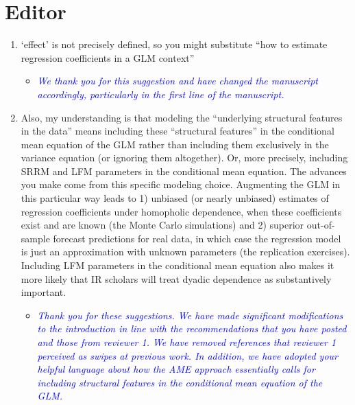 \section*{Editor}

\begin{enumerate}
	\item `effect' is not precisely defined, so you might substitute ``how to estimate regression coefficients in a GLM context''
	\begin{itemize}
		\item \textcolor{blue}{ \emph{
		We thank you for this suggestion and have changed the manuscript accordingly, particularly in the first line of the manuscript.}}
	\end{itemize}
	\item Also, my understanding is that modeling the ``underlying structural features in the data'' means including these ``structural features'' in the conditional mean equation of the GLM rather than including them exclusively in the variance equation (or ignoring them altogether). Or, more precisely, including SRRM and LFM parameters in the conditional mean equation. The advances you make come from this specific modeling choice. Augmenting the GLM in this particular way leads to 1) unbiased (or nearly unbiased) estimates of regression coefficients under homopholic dependence, when these coefficients exist and are known (the Monte Carlo simulations) and 2) superior out-of-sample forecast predictions for real data, in which case the regression model is just an approximation with unknown parameters (the replication exercises). Including LFM parameters in the conditional mean equation also makes it more likely that IR scholars will treat dyadic dependence as substantively important.
	\begin{itemize}
		\item \textcolor{blue}{ \emph{
			Thank you for these suggestions. We have made significant modifications to the introduction in line with the recommendations that you have posted and those from reviewer 1. We have removed references that reviewer 1 perceived as swipes at previous work. In addition, we have adopted your helpful language about how the AME approach essentially calls for including structural features in the conditional mean equation of the GLM. 
			}}
	\end{itemize}
\end{enumerate}
